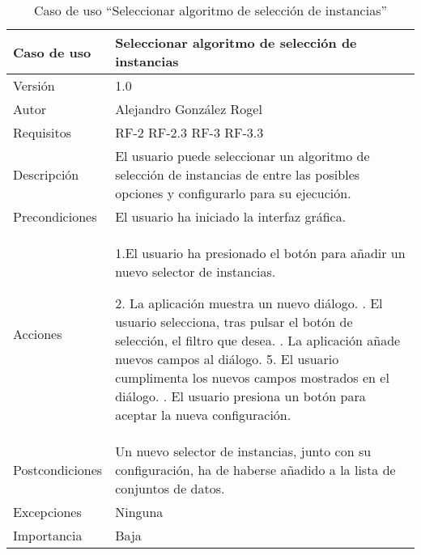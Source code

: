  
   \begin{table}
  \begin{center}
   \begin{tabular}{|>{} L{3cm} | L{9cm} |}
    \hline
    Caso de uso & Seleccionar algoritmo de selección de instancias\\
    \hline
    Versión & 1.0 \\
    \hline
    Autor & Alejandro González Rogel \\
    \hline
    Requisitos & RF-2\newline
    				 RF-2.3\newline
    				 RF-3\newline
    				 RF-3.3 \\
    \hline
    Descripción & El usuario puede seleccionar un algoritmo de selección de instancias de entre las posibles opciones y configurarlo para su ejecución. \\
    \hline
    Precondiciones & El usuario ha iniciado la interfaz gráfica.\\
    \hline
    		Acciones & 1.El usuario ha presionado el botón para añadir un nuevo selector de instancias.  \newline
    		
    		2. La aplicación muestra un nuevo diálogo. . El usuario selecciona, tras pulsar el botón de selección, el filtro que desea. . La aplicación añade nuevos campos al diálogo.
    		5. El usuario cumplimenta los nuevos campos mostrados en el diálogo. . El usuario presiona un botón para aceptar la nueva configuración. \\
    \hline
    Postcondiciones & Un nuevo selector de instancias, junto con su configuración, ha de haberse añadido a la lista de conjuntos de datos. \\
    \hline
    Excepciones & Ninguna \\
    \hline
    Importancia & Baja \\
    \hline
   \end{tabular}
   \caption{Caso de uso ``Seleccionar algoritmo de selección de instancias''}
   \label{tabla:casoUso7}
  \end{center}
 \end{table}
 

